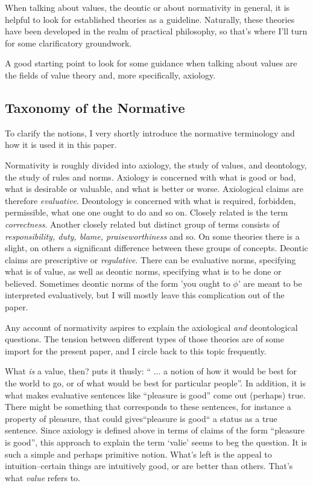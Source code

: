 \documentclass[12pt,numbers=noenddot]{scrartcl}
\begin{document}
When talking about values, the deontic or about normativity in general, it is helpful to look for established theories as a guideline. Naturally, these theories have been developed in the realm of practical philosophy, so that's where I'll turn for some clarificatory groundwork.

A good starting point to look for some guidance when talking about values are the fields of value theory and, more specifically, axiology.

\subsection{ Taxonomy of the Normative}

To clarify the notions, I very shortly introduce the normative terminology and how it is used it in this paper.

Normativity is roughly divided into axiology, the study of values, and deontology, the study of rules and norms. Axiology is concerned with what is good or bad, what is desirable or valuable, and what is better or worse. Axiological claims are therefore \emph{evaluative}. Deontology is concerned with what is required, forbidden, permissible, what one one ought to do and so on. Closely related is the term \emph{correctness}. Another closely related but distinct group of terms consists of \emph{responsibility, duty, blame, praiseworthiness} and so. On some theories there is a slight, on others a significant difference between these groups of concepts. Deontic claims are prescriptive or \emph{regulative}. There can be evaluative norms, specifying what is of value, as well as deontic norms, specifying what is to be done or believed. Sometimes deontic norms of the form 'you ought to $\phi$' are meant to be interpreted evaluatively, but I will mostly leave this complication out of the paper.

Any account of normativity aspires to explain the axiological \emph{and} deontological questions. The tension between different types of those theories are of some import for the present paper, and I circle back to this topic frequently.

What \emph{is} a value, then? \textcite[79]{scanlon1998} puts it thusly: “ ... a notion of how it would be best for the world to go, or of what would be best for particular people”. In addition, it is what makes evaluative sentences like “pleasure is good” come out (perhaps) true. There might be something that corresponds to these sentences, for instance a property of pleasure, that could gives“pleasure is good“ a status as a true sentence. Since axiology is defined above in terms of claims of the form “pleasure is good”, this approach to explain the term ‘valie’ seems to beg the question. It is such a simple and perhaps primitive notion. What's left is the appeal to intuition–certain things are intuitively good, or are better than others. That's what \emph{value} refers to.
\end{document}
